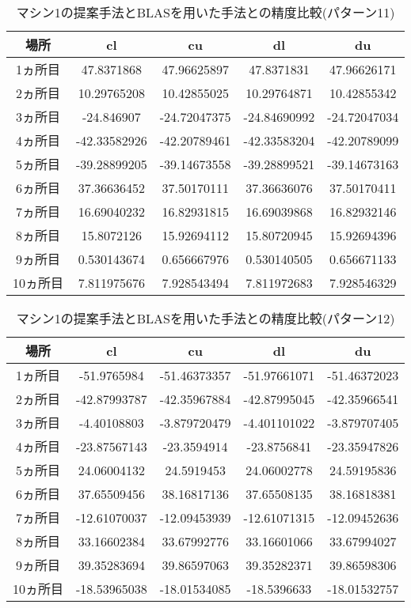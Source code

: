 \documentclass[11pt,a4paper]{jsreport}
\theoremstyle{definition}
\begin{document}
\begin{table}[H]
\centering
\begin{tabular}{|c|c|c|c|c|}
\hline
場所 & cl & cu & dl & du \\ \hline
1ヵ所目 & 47.8371868 & 47.96625897 & 47.8371831 & 47.96626171 \\ \hline
2ヵ所目 & 10.29765208 & 10.42855025 & 10.29764871 & 10.42855342 \\ \hline
3ヵ所目 & -24.846907 & -24.72047375 & -24.84690992 & -24.72047034 \\ \hline
4ヵ所目 & -42.33582926 & -42.20789461 & -42.33583204 & -42.20789099 \\ \hline
5ヵ所目 & -39.28899205 & -39.14673558 & -39.28899521 & -39.14673163 \\ \hline
6ヵ所目 & 37.36636452 & 37.50170111 & 37.36636076 & 37.50170411 \\ \hline
7ヵ所目 & 16.69040232 & 16.82931815 & 16.69039868 & 16.82932146 \\ \hline
8ヵ所目 & 15.8072126 & 15.92694112 & 15.80720945 & 15.92694396 \\ \hline
9ヵ所目 & 0.530143674 & 0.656667976 & 0.530140505 & 0.656671133 \\ \hline
10ヵ所目 & 7.811975676 & 7.928543494 & 7.811972683 & 7.928546329 \\ \hline
\end{tabular}
\caption{マシン1の提案手法とBLASを用いた手法との精度比較(パターン11)}
\end{table}

\begin{table}[H]
\centering
\begin{tabular}{|c|c|c|c|c|}
\hline
場所 & cl & cu & dl & du \\ \hline
1ヵ所目 & -51.9765984 & -51.46373357 & -51.97661071 & -51.46372023 \\ \hline
2ヵ所目 & -42.87993787 & -42.35967884 & -42.87995045 & -42.35966541 \\ \hline
3ヵ所目 & -4.40108803 & -3.879720479 & -4.401101022 & -3.879707405 \\ \hline
4ヵ所目 & -23.87567143 & -23.3594914 & -23.8756841 & -23.35947826 \\ \hline
5ヵ所目 & 24.06004132 & 24.5919453 & 24.06002778 & 24.59195836 \\ \hline
6ヵ所目 & 37.65509456 & 38.16817136 & 37.65508135 & 38.16818381 \\ \hline
7ヵ所目 & -12.61070037 & -12.09453939 & -12.61071315 & -12.09452636 \\ \hline
8ヵ所目 & 33.16602384 & 33.67992776 & 33.16601066 & 33.67994027 \\ \hline
9ヵ所目 & 39.35283694 & 39.86597063 & 39.35282371 & 39.86598306 \\ \hline
10ヵ所目 & -18.53965038 & -18.01534085 & -18.5396633 & -18.01532757 \\ \hline
\end{tabular}
\caption{マシン1の提案手法とBLASを用いた手法との精度比較(パターン12)}
\end{table}
\end{document}
